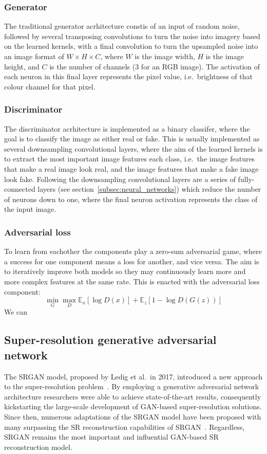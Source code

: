\subsubsection{Generator}
The traditional generator acrhitecture constis of an input of random noise, followed by several transposing convolutions to turn the noise into imagery based on the learned kernels, with a final convolution to turn the upsampled noise into an image format of $W \times H \times C$, where $W$ is the image width, $H$ is the image height, and $C$ is the number of channels (3 for an RGB image). The activation of each neuron in this final layer represents the pixel value, i.e.\ brightness of that colour channel for that pixel.

\subsubsection{Discriminator}
The discriminator acrhitecture is implemented as a binary classifer, where the goal is to classify the image as either real or fake. This is usually implemented as several downsampling convolutional layers, where the aim of the learned kernels is to extract the most important image features each class, i.e.\ the image features that make a real image look real, and the image features that make a fake image look fake. Following the downsampling convolutional layers are a series of fully-connected layers (see section~\ref{subsec:neural_networks}) which reduce the number of neurons down to one, where the final neuron activation represents the class of the input image.

\subsubsection{Adversarial loss}
To learn from eachother the components play a zero-sum adversarial game, where a success for one component means a loss for another, and vice versa. The aim is to iteratively improve both models so they may continuously learn more and more complex features at the same rate. This is enacted with the adversarial loss component:
\[\min_G\max_D\mathbb{E}_x[\log D(x)] + \mathbb{E}_z[1 - \log D(G(z))]\]
We can 

\subsection{Super-resolution generative adversarial network}
The SRGAN model, proposed by Ledig et al.\ in 2017, introduced a new approach to the super-resolution problem~\cite{srgan}. By employing a generative adversarial network architecture researchers were able to achieve state-of-the-art results, consequently kickstarting the large-scale development of GAN-based super-resolution solutions. Since then, numerous adaptations of the SRGAN model have been proposed with many surpassing the SR reconstruction capabilities of SRGAN~\cite{models}. Regardless, SRGAN remains the most important and influential GAN-based SR reconstruction model.

